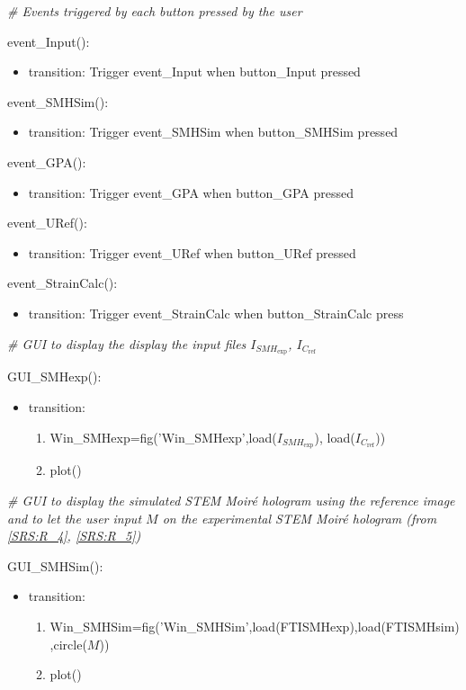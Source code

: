 \documentclass[12pt, titlepage]{article}
\begin{document}
\noindent\textit{{\#} Events triggered by each button pressed by the 
user}\medskip

\noindent event{\_}Input():
\begin{itemize}
\item transition: Trigger event{\_}Input when button{\_}Input pressed
\end{itemize}
\bigskip
\noindent event{\_}SMHSim():
\begin{itemize}
\item transition: Trigger event{\_}SMHSim when button{\_}SMHSim pressed
\end{itemize}
\bigskip
\noindent event{\_}GPA():
\begin{itemize}
\item transition: Trigger event{\_}GPA when button{\_}GPA pressed
\end{itemize}
\bigskip
\noindent event{\_}URef():
\begin{itemize}
\item transition: Trigger event{\_}URef when button{\_}URef pressed
\end{itemize}
\bigskip
\noindent event{\_}StrainCalc():
\begin{itemize}
\item transition: Trigger event{\_}StrainCalc when button{\_}StrainCalc press
\end{itemize}
\bigskip

\noindent\textit{{\#} GUI to display the display the input files 
$I_{\mathit{SMH}_{\text{exp}}}$, $I_{C_{\text{ref}}}$}\medskip

\noindent GUI{\_}SMHexp():
\begin{itemize}
\item transition: 
	\begin{enumerate}
	\item Win{\_}SMHexp=fig('Win{\_}SMHexp',load($I_{\mathit{SMH}_{\text{exp}}}$), 
load($I_{C_{\text{ref}}}$))
	\item plot()
	\end{enumerate} 
\end{itemize}
\bigskip


\noindent\textit{{\#} GUI to display the simulated STEM Moir{\'e} hologram using 
the reference image and to let the user input $M$ on the experimental STEM 
Moir{\'e} hologram (from \cref{SRS:R_4}, \cref{SRS:R_5})}\medskip

\noindent GUI{\_}SMHSim():
\begin{itemize}
\item transition: 
	\begin{enumerate}
	\item 
Win{\_}SMHSim=fig('Win{\_}SMHSim',load(FTISMHexp),load(FTISMHsim),circle($M$))
	\item plot()
	\end{enumerate} 
\end{itemize}
\bigskip
\end{document}
